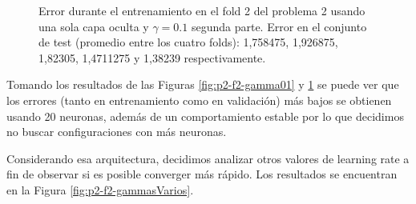 \documentclass[informe.tex]{subfiles}
\begin{document}
\begin{figure}[H]
        \caption{Error durante el entrenamiento en el fold 2 del problema 2 usando una sola capa oculta y $\gamma=0.1$ segunda parte. Error en el conjunto de test (promedio entre los cuatro folds): 1,758475, 1,926875, 1,82305, 1,4711275 y 1,38239 respectivamente.}\label{fig:p2-f2-gamma01-segundaParte}
    \end{figure}
    
    
    Tomando los resultados de las Figuras \ref{fig:p2-f2-gamma01} y \ref{fig:p2-f2-gamma01-segundaParte} se puede ver que los errores (tanto en entrenamiento como en validaci\'on) m\'as bajos se obtienen usando 20 neuronas, además de un comportamiento estable por lo que decidimos no buscar configuraciones con más neuronas.
    
    Considerando esa arquitectura, decidimos analizar otros valores de learning rate a fin de observar si es posible converger más rápido. Los resultados se encuentran en la Figura \ref{fig:p2-f2-gammasVarios}.
    
\end{document}
